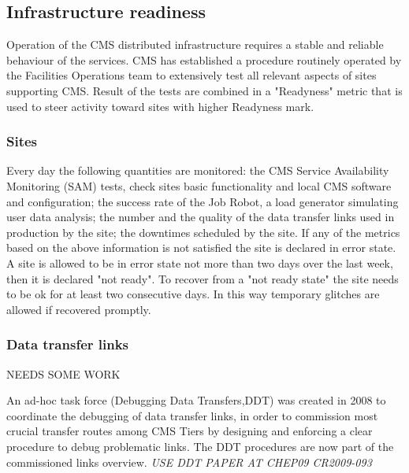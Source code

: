 \subsection{Infrastructure readiness}
\label{sec:4_2}
Operation of the CMS distributed infrastructure
requires a stable and reliable behaviour of the services.
CMS has established a procedure routinely operated by
the Facilities Operations team to extensively test all relevant
aspects of sites supporting CMS. Result of the tests are
combined in a "Readyness" metric that is used to steer
activity toward sites with higher Readyness mark.
\subsubsection{ Sites }
\label{sec:4_2_1} 

Every day the following quantities are monitored:
the CMS Service Availability Monitoring (SAM) tests,
check sites basic 
functionality and local CMS software and configuration;
the success rate of the Job Robot, a load generator simulating
user data analysis; the number and the quality of the data
transfer links used in production by the site;
the downtimes scheduled by the site.
If any of the metrics based on the above
information is not satisfied the site is declared in
error state. A site is allowed to be in error state
not more than two days over the last week, then it
is declared "not ready". To recover from a "not ready state"
the site needs to be ok for at least two consecutive days.
In this way temporary glitches are allowed if recovered promptly.


\subsubsection{ Data transfer links }
\label{sec:LinkCommissioning}
NEEDS SOME WORK

An ad-hoc task force (Debugging Data Transfers,DDT)\cite{RefDDT}
was created in 2008 to coordinate the debugging of data transfer links,
in order to commission most crucial transfer routes among
CMS Tiers by designing and enforcing a clear procedure
to debug problematic links.
The DDT procedures are now part of the commissioned links overview.
\emph{USE DDT PAPER AT CHEP09 CR2009-093}


